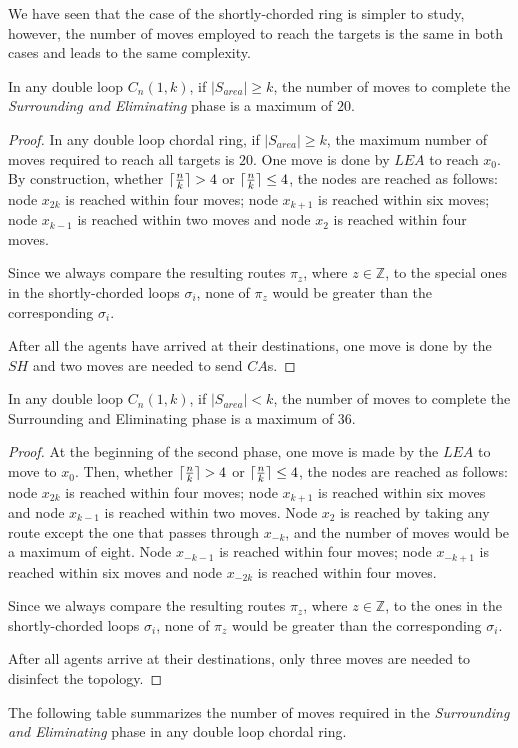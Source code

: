 We have seen that the case of the shortly-chorded ring is simpler to study, however, the number of moves employed to reach the targets is the same in both cases and leads to the same complexity. 
 
 \begin{theorem}
In any double loop   $C_n(1,k)$,  if $\left\vert{S_{area}}\right\vert \ge k$,  
the number of moves to complete the  {\em Surrounding  and Eliminating} phase is a maximum of $20$.
\end{theorem}
 \begin{proof}
In any double loop chordal ring, if $\left\vert{S_{area}}\right\vert \ge k$, the maximum number of moves required to reach all targets is $20$.
One move is done by $LEA$ to reach $x_0$.
By construction, whether  $\lceil {n \over k} \rceil >  4$ or  $\lceil {n \over k} \rceil \leq  4$, the nodes are reached as follows: 
node $x_{2k}$ is reached within four moves; node $x_{k+1}$ is reached within six moves;
node $x_{k-1}$ is reached within two moves and node $x_{2}$ is reached within four moves.
 

Since we always compare the resulting routes $\pi_z$, where $z \in \mathbb{Z}$,  to the special ones in the shortly-chorded loops $\sigma_i$, none of $\pi_z$ would be greater than the corresponding $\sigma_i$. 

After all the agents have arrived at their destinations, one move is done by the $SH$ and two moves are needed to send $CA$s.
\end{proof}

\begin{theorem}
In any double loop  $C_n(1,k)$,  if $\left\vert{S_{area}}\right\vert < k$, 
the number of moves to complete the Surrounding and Eliminating phase is a maximum of 36.
\end{theorem}

 \begin{proof}
At the beginning of the second phase, one move is made by the $LEA$ to move to $x_0$. Then, whether  $\lceil {n \over k} \rceil >  4$ or  $\lceil {n \over k} \rceil \leq  4$, the nodes are reached as follows: 
 node $x_{2k}$ is reached within four moves; node $x_{k+1}$ is reached within six moves and node $x_{k-1}$ is reached within two moves. Node $x_{2}$ is reached by taking any route except the one that passes through $x_{-k}$, and the number of moves would be a maximum of eight. Node $x_{-k-1}$ is reached within four moves; node $x_{-k+1}$ is reached within six moves and node $x_{-2k}$ is reached within four moves.


Since we always compare the resulting routes $\pi_z$, where $z \in \mathbb{Z}$,  to the ones  in the shortly-chorded loops $\sigma_i$, none of $\pi_z$ would be greater than the corresponding $\sigma_i$. 

After all agents arrive at their destinations, only three moves are needed to disinfect the topology.
\end{proof}
 The following table summarizes the number of moves required in the {\em Surrounding and Eliminating} phase in any double loop chordal ring.


